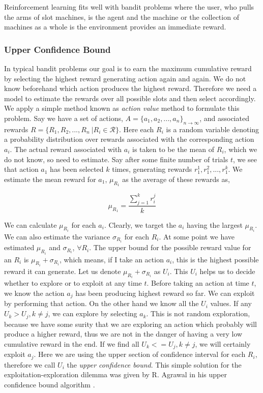 \documentclass[english]{tktltiki}
\begin{document}
Reinforcement learning fits well with bandit problems where the user, who pulls the arms of slot machines, is the agent and the machine or the collection of machines as a whole is the environment provides an immediate reward.

\subsubsection{Upper Confidence Bound}

In typical bandit problems our goal is to earn the maximum cumulative reward by selecting the highest reward generating action again and again. We do not know beforehand which action produces the highest reward. Therefore we need a model to estimate the rewards over all possible slots and then select accordingly. We apply a simple method known as \textit{action value} method \cite{reinforcement_learning} to formulate this problem. Say we have a set of actions, $A = \{a_1, a_2, ..., a_n\}_{n \to \infty}$, and associated rewards $R = \{R_1, R_2, ..., R_n\ | R_i \in \mathcal{R}\}$. Here each $R_i$ is a random variable denoting a probability distribution over rewards associated with the corresponding action $a_i$. The actual reward associated with $a_i$ is taken to be the mean of $R_i$, which we do not know, so need to estimate. Say after some finite number of trials $t$, we see that action $a_1$ has been selected $k$ times, generating rewards $r_1^1, r_1^2, ..., r_1^k$. We estimate the mean reward for $a_1$, $\mu_{R_1}$ as the average of these rewards as,

\begin{equation}
\mu_{R_1} = \frac{\sum_{j = 1}^k{r_i^j}}{k}
\end{equation}

We can calculate $\mu_{R_i}$ for each $a_i$. Clearly, we target the $a_i$ having the largest $\mu_{R_i}$. We can also estimate the variance $\sigma_{R_i}$ for each $R_i$. At some point we have estimated $\mu_{R_i}$ and $\sigma_{R_i}$, $\forall R_i$. The upper bound for the possible reward value for an $R_i$ is $\mu_{R_i} + \sigma_{R_i}$, which means, if I take an action $a_i$, this is the highest possible reward it can generate. Let us denote $\mu_{R_i} + \sigma_{R_i}$ as $U_i$. This $U_i$ helps us to decide whether to explore or to exploit at any time $t$. Before taking an action at time $t$, we know the action $a_j$ has been producing highest reward so far. We can exploit by performing that action. On the other hand we know all the $U_i$ values. If any $U_k > U_j, k \neq j$, we can explore by selecting $a_k$. This is not random exploration, because we have some surity that we are exploring an action which probably will produce a higher reward, thus we are not in the danger of having a very low cumulative reward in the end. If we find all $U_k <= U_j, k \neq j$, we will certainly exploit $a_j$. Here we are using the upper section of confidence interval for each $R_i$, therefore we call $U_i$ the \textit{upper confidence bound}. This simple solution for the exploitation-exploration dilemma was given by R. Agrawal in his upper confidence bound algorithm \cite{ucb}.
\end{document}
